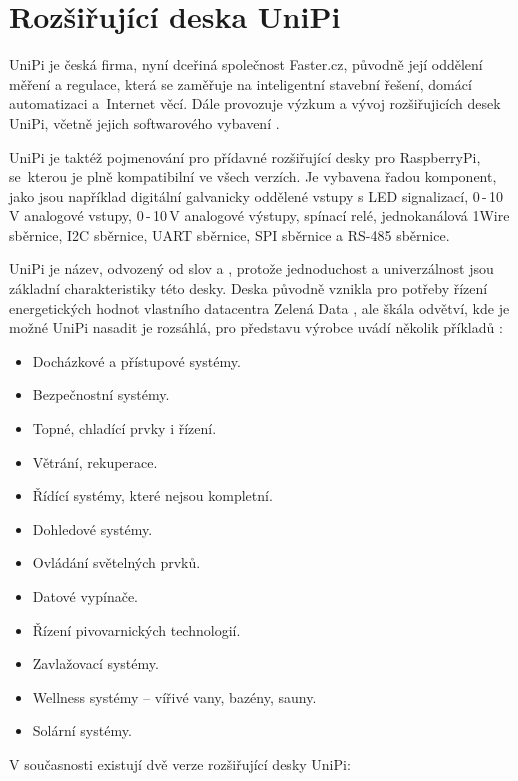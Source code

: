 \chapter{Rozšiřující deska UniPi}
\label{KapUnipi}

UniPi je česká firma, nyní dceřiná společnost Faster.cz, původně její oddělení měření a regulace, která se zaměřuje na inteligentní stavební řešení, domácí automatizaci a~Internet věcí. Dále provozuje výzkum a vývoj rozšiřujicích desek UniPi, včetně jejich softwarového vybavení \cite{UniPi}.

UniPi je taktéž pojmenování pro přídavné rozšiřující desky pro RaspberryPi, se~kterou je plně kompatibilní ve všech verzích. Je vybavena řadou komponent, jako jsou například digitální galvanicky oddělené vstupy s LED signalizací, 0\,-\,10\,V analogové vstupy, 0\,-\,10\,V analogové výstupy, spínací relé, jednokanálová 1Wire sběrnice, I2C sběrnice, UART sběrnice, SPI sběrnice a RS-485 sběrnice.

UniPi je název, odvozený od slov  a , protože jednoduchost a univerzálnost jsou základní charakteristiky této desky. Deska původně vznikla pro potřeby řízení energetických hodnot vlastního datacentra Zelená Data \cite{ZelenaData}, ale škála odvětví, kde je možné UniPi nasadit je rozsáhlá, pro představu výrobce uvádí několik příkladů \cite{UniPi}:
\begin{itemize}
	\item Docházkové a přístupové systémy.
	\item Bezpečnostní systémy.
	\item Topné, chladící prvky i řízení.
	\item Větrání, rekuperace.
	\item Řídící systémy, které nejsou kompletní.
	\item Dohledové systémy.
	\item Ovládání světelných prvků.
	\item Datové vypínače.
	\item Řízení pivovarnických technologií.
	\item Zavlažovací systémy.
	\item Wellness systémy – vířivé vany, bazény, sauny.
	\item Solární systémy.
\end{itemize}

\vspace{5mm}
\noindent
 V současnosti existují dvě verze rozšiřující desky UniPi:


